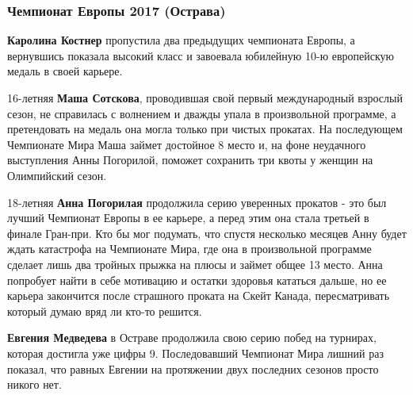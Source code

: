  
 
 
 
 
\subsubsection{Чемпионат Европы 2017 (Острава)}

\textbf{Каролина Костнер} пропустила два предыдущих чемпионата Европы, а вернувшись
показала высокий класс и завоевала юбилейную 10-ю европейскую медаль в своей
карьере.


16-летняя \textbf{Маша Сотскова}, проводившая свой первый международный
взрослый сезон, не справилась с волнением и дважды упала в произвольной
программе, а претендовать на медаль она могла только при чистых прокатах. На
последующем Чемпионате Мира Маша займет достойное 8 место и, на фоне неудачного
выступления Анны Погорилой, поможет сохранить три квоты у женщин на Олимпийский
сезон.


18-летняя \textbf{Анна Погорилая} продолжила серию уверенных прокатов - это был
лучший Чемпионат Европы в ее карьере, а перед этим она стала третьей в финале
Гран-при. Кто бы мог подумать, что спустя несколько месяцев Анну будет ждать
катастрофа на Чемпионате Мира, где она в произвольной программе сделает лишь
два тройных прыжка на плюсы и займет общее 13 место. Анна попробует найти в
себе мотивацию и остатки здоровья кататься дальше, но ее карьера закончится
после страшного проката на Скейт Канада, пересматривать который думаю вряд ли
кто-то решится.

\textbf{Евгения Медведева} в Остраве продолжила свою серию побед на турнирах,
которая достигла уже цифры 9. Последовавший Чемпионат Мира лишний раз показал,
что равных Евгении на протяжении двух последних сезонов просто никого нет.
